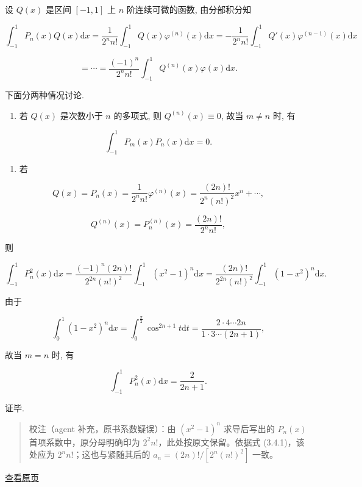 \documentclass[
  10pt,
  fontset=fandol]{ctexart}
\providecommand{\tightlist}{%
  \setlength{\itemsep}{0pt}\setlength{\parskip}{0pt}}
\begin{document}
设 \(Q(x)\) 是区间 \([-1, 1]\) 上 \(n\) 阶连续可微的函数, 由分部积分知

\[
\int_{-1}^{1} P_n(x) Q(x) \mathrm{d}x = \frac{1}{2^n n!} \int_{-1}^{1} Q(x) \varphi^{(n)}(x) \mathrm{d}x = -\frac{1}{2^n n!} \int_{-1}^{1} Q'(x) \varphi^{(n-1)}(x) \mathrm{d}x
\]

\[
= \cdots = \frac{(-1)^n}{2^n n!} \int_{-1}^{1} Q^{(n)}(x) \varphi(x) \mathrm{d}x.
\]

下面分两种情况讨论.

\begin{enumerate}
\def\labelenumi{(\arabic{enumi})}
\tightlist
\item
  若 \(Q(x)\) 是次数小于 \(n\) 的多项式, 则 \(Q^{(n)}(x) \equiv 0\), 故当 \(m \neq n\) 时, 有
\end{enumerate}

\[
\int_{-1}^{1} P_m(x) P_n(x) \mathrm{d}x = 0.
\]

\begin{enumerate}
\def\labelenumi{(\arabic{enumi})}
\setcounter{enumi}{1}
\tightlist
\item
  若
\end{enumerate}

\[
Q(x) = P_n(x) = \frac{1}{2^n n!} \varphi^{(n)}(x) = \frac{(2n)!}{2^n (n!)^2} x^n + \cdots,
\]

\[
Q^{(n)}(x) = P_n^{(n)}(x) = \frac{(2n)!}{2^n n!},
\]

则

\[
\int_{-1}^{1} P_n^2(x) \mathrm{d}x = \frac{(-1)^n (2n)!}{2^{2n} (n!)^2} \int_{-1}^{1} (x^2 - 1)^n \mathrm{d}x = \frac{(2n)!}{2^{2n} (n!)^2} \int_{-1}^{1} (1 - x^2)^n \mathrm{d}x.
\]

由于

\[
\int_{0}^{1} (1 - x^2)^n \mathrm{d}x = \int_{0}^{\frac{\pi}{2}} \cos^{2n+1} t \mathrm{d}t = \frac{2 \cdot 4 \cdots 2n}{1 \cdot 3 \cdots (2n+1)},
\]

故当 \(m = n\) 时, 有

\[
\int_{-1}^{1} P_n^2(x) \mathrm{d}x = \frac{2}{2n+1}.
\]

证毕.

\begin{quote}
校注（agent 补充，原书系数疑误）：由 \((x^2-1)^n\) 求导后写出的 \(P_n(x)\) 首项系数中，原分母明确印为 \(2^2n!\)，此处按原文保留。依据式 (3.4.1)，该处应为 \(2^nn!\)；这也与紧随其后的 \(a_n=(2n)!/[2^n(n!)^2]\) 一致。
\end{quote}

\href{../../source-images/pdf-072.jpeg}{查看原页}
\end{document}
